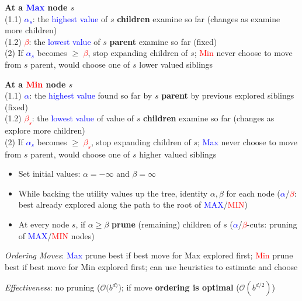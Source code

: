 \documentclass[7pt,landscape]{article}
\begin{document}
\begin{multicols}{2}
\textbf{At a \textcolor{blue}{Max} node $s$} \\
(1.1) \textcolor{blue}{$\alpha_s$}: the \textcolor{blue}{highest value} of $s$ \textbf{children} examine so far (changes as examine more children) \\
(1.2) \textcolor{red}{$\beta$}: the \textcolor{blue}{lowest value} of $s$ \textbf{parent} examine so far (fixed) \\
(2) If \textcolor{blue}{$\alpha_s$} becomes $\ge$ \textcolor{red}{$\beta$}, stop expanding children of $s$; \textcolor{red}{Min} never choose to move from $s$ parent, would choose one of $s$ lower valued siblings 

\textbf{At a \textcolor{red}{Min} node $s$} \\
(1.1) \textcolor{blue}{$\alpha$}: the \textcolor{blue}{highest value} found so far by $s$ \textbf{parent} by previous explored siblings (fixed) \\
(1.2) \textcolor{red}{$\beta_s$}: the \textcolor{blue}{lowest value} of value of $s$ \textbf{children} examine so far (changes as explore more children) \\
(2) If \textcolor{blue}{$\alpha_s$} becomes $\ge$ \textcolor{red}{$\beta_s$}, stop expanding children of $s$; \textcolor{blue}{Max} never choose to move from $s$ parent, would choose one of $s$ higher valued siblings 

\begin{itemize}
    \item Set initial values: $\alpha = - \infty$ and $\beta = \infty$
    \item While backing the utility values up the tree, identity $\alpha, \beta$ for each node (\textcolor{blue}{$\alpha$}/\textcolor{red}{$\beta$}: best already explored along the path to the root of \textcolor{blue}{MAX}/\textcolor{red}{MIN})
    \item At every node $s$, if $\alpha \ge \beta$ \textbf{prune} (remaining) children of $s$ (\textcolor{blue}{$\alpha$}/\textcolor{red}{$\beta$}-cuts: pruning of \textcolor{blue}{MAX}/\textcolor{red}{MIN} nodes)
\end{itemize}

\textit{Ordering Moves}: \textcolor{blue}{Max} prune best if best move for Max explored first; \textcolor{red}{Min} prune best if best move for Min explored first; can use heuristics to estimate and choose 

\textit{Effectiveness}: no pruning ($\mathcal{O} (b^{d)}$); if move \textbf{ordering is optimal} ($\mathcal{O} (b^{d/2})$)


\end{multicols}
\end{document}
